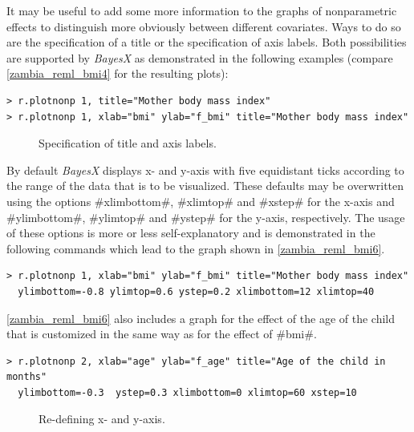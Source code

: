 \documentclass[11pt,a4paper,twoside]{bayesxreport}
\begin{document}
It may be useful to add some more information to the graphs of
nonparametric effects to distinguish more obviously between
different covariates. Ways to do so are the specification of a title
or the specification of axis labels. Both possibilities are
supported by {\it BayesX} as demonstrated in the following examples
(compare \autoref{zambia_reml_bmi4} for the resulting plots):

\begin{verbatim}
> r.plotnonp 1, title="Mother body mass index"
> r.plotnonp 1, xlab="bmi" ylab="f_bmi" title="Mother body mass index"
\end{verbatim}

\begin{figure}[ht]
\begin{center}
\begin{multicols}{2}
\end{multicols}
{\it\caption{Specification of title and axis
labels.\label{zambia_reml_bmi4}}}
\end{center}
\end{figure}

By default {\it BayesX} displays x- and y-axis with five equidistant
ticks according to the range of the data that is to be visualized.
These defaults may be overwritten using the options #xlimbottom#,
#xlimtop# and #xstep# for the x-axis and #ylimbottom#, #ylimtop# and
#ystep# for the y-axis, respectively. The usage of these options is
more or less self-explanatory and is demonstrated in the following
commands which lead to the graph shown in
\autoref{zambia_reml_bmi6}.

\begin{verbatim}
> r.plotnonp 1, xlab="bmi" ylab="f_bmi" title="Mother body mass index"
  ylimbottom=-0.8 ylimtop=0.6 ystep=0.2 xlimbottom=12 xlimtop=40
\end{verbatim}

\autoref{zambia_reml_bmi6} also includes a graph for the effect of
the age of the child that is customized in the same way as for the
effect of #bmi#.

\begin{verbatim}
> r.plotnonp 2, xlab="age" ylab="f_age" title="Age of the child in months"
  ylimbottom=-0.3  ystep=0.3 xlimbottom=0 xlimtop=60 xstep=10
\end{verbatim}

\begin{figure}[ht]
\begin{center}
{\it\caption{Re-defining x- and y-axis.\label{zambia_reml_bmi6}}}
\end{center}
\end{figure}
\end{document}
